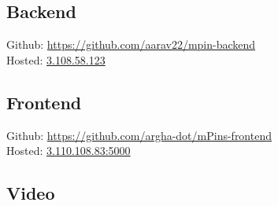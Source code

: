 \documentclass[]{article}   %
\begin{document}
\subsection*{Backend}
Github: \url{https://github.com/aarav22/mpin-backend} \\
Hosted: \url{3.108.58.123}
\subsection*{Frontend}
Github: \url{https://github.com/argha-dot/mPins-frontend} \\
Hosted: \url{3.110.108.83:5000}
\subsection*{Video}



\nocite{*}


\end{document}

